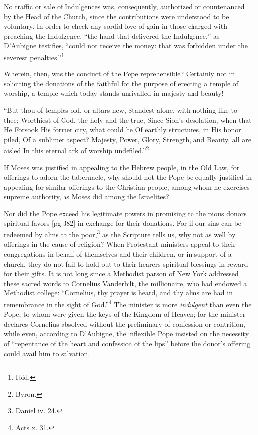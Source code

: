 No traffic or sale of Indulgences was, consequently,
authorized or countenanced by the Head
of the Church, since the contributions were understood
to be voluntary. In order to check any
sordid love of gain in those charged with preaching
the Indulgence, “the hand that delivered the
Indulgence,” as D'Aubigne testifies, “could not
receive the money: that was forbidden under the
severest penalties.”\footnote{Ibid.}

Wherein, then, was the conduct of the Pope reprehensible?
Certainly not in soliciting the donations
of the faithful for the purpose of erecting a
temple of worship, a temple which today stands
unrivalled in majesty and beauty!

“But thou of temples old, or altars new,
Standest alone, with nothing like to thee;
Worthiest of God, the holy and the true,
Since Sion's desolation, when that He
Forsook His former city, what could be
Of earthly structures, in His honor piled,
Of a sublimer aspect? Majesty,
Power, Glory, Strength, and Beauty, all are aisled
In this eternal ark of worship
undefiled.”\footnote{Byron.}

If Moses was justified in appealing to the
Hebrew people, in the Old Law, for offerings to
adorn the tabernacle, why should not the Pope be
equally justified in appealing for similar offerings
to the Christian people, among whom he exercises
supreme authority, as Moses did among the Israelites?

Nor did the Pope exceed his legitimate powers
in promising to the pious donors spiritual favors
[pg 382]
in exchange for their donations. For if our sins
can be redeemed by alms to the poor,\footnote{Daniel
iv. 24.} as the Scripture
tells us, why not as well by offerings in the
cause of religion? When Protestant ministers appeal
to their congregations in behalf of themselves
and their children, or in support of a church, they
do not fail to hold out to their hearers spiritual
blessings in reward for their gifts. It is not long
since a Methodist parson of New York addressed
these sacred words to Cornelius Vanderbilt, the
millionaire, who had endowed a Methodist college:
“Cornelius, thy prayer is heard, and thy
alms are had in remembrance in the sight of
God.”\footnote{Acts x.
31.} The minister is more \emph{indulgent} than even
the Pope, to whom were given the keys of the
Kingdom of Heaven; for the minister declares
Cornelius absolved without the preliminary of
confession or contrition, while even, according to
D'Aubigne, the inflexible Pope insisted on the
necessity of “repentance of the heart and confession
of the lips” before the donor's offering could
avail him to salvation.

